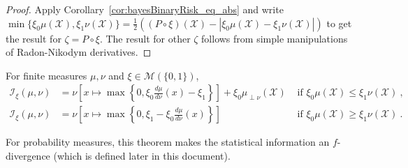 \begin{proof}%
{}
Apply Corollary~\ref{cor:bayesBinaryRisk_eq_abs} and write $\min\{\xi_0\mu(\mathcal X), \xi_1\nu(\mathcal X)\} = \frac{1}{2}\left((P \circ \xi)(\mathcal X) - \left\vert \xi_0\mu(\mathcal X) - \xi_1\nu(\mathcal X) \right\vert \right)$ to get the result for $\zeta = P \circ \xi$.
The result for other $\zeta$ follows from simple manipulations of Radon-Nikodym derivatives.
\end{proof}


\begin{theorem}
  \label{thm:statInfo_eq_integral}
  \leanok
  For finite measures $\mu, \nu$ and $\xi \in \mathcal M(\{0,1\})$,
  \begin{align*}
  \mathcal I_\xi(\mu, \nu)
  &= \nu\left[ x \mapsto \max \left\{0 , \xi_0\frac{d \mu}{d\nu}(x) - \xi_1 \right\} \right] + \xi_0 \mu_{\perp \nu}(\mathcal X) & \text{ if } \xi_0 \mu(\mathcal X) \le \xi_1 \nu(\mathcal X)
  \: , \\
  \mathcal I_\xi(\mu, \nu)
  &= \nu\left[ x \mapsto \max \left\{0 , \xi_1 - \xi_0\frac{d \mu}{d\nu}(x) \right\} \right] & \text{ if } \xi_0 \mu(\mathcal X) \ge \xi_1 \nu(\mathcal X)
  \: .
  \end{align*}
  
\end{theorem}

For probability measures, this theorem makes the statistical information an $f$-divergence (which is defined later in this document).

